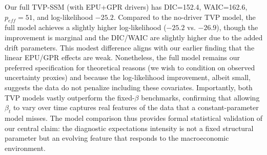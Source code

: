 \documentclass[12pt]{article}
\begin{document}
Our full TVP-SSM (with EPU+GPR drivers) has DIC=152.4, WAIC=162.6, $p_{eff}=51$, and log-likelihood $-25.2$. Compared to the no-driver TVP model, the full model achieves a slightly higher log-likelihood ($-25.2$ vs. $-26.9$), though the improvement is marginal and the DIC/WAIC are slightly higher due to the added drift parameters. This modest difference aligns with our earlier finding that the linear EPU/GPR effects are weak. Nonetheless, the full model remains our preferred specification for theoretical reasons (we wish to condition on observed uncertainty proxies) and because the log-likelihood improvement, albeit small, suggests the data do not penalize including these covariates. Importantly, both TVP models vastly outperform the fixed-$\beta$ benchmarks, confirming that allowing $\beta_t$ to vary over time captures real features of the data that a constant-parameter model misses. The model comparison thus provides formal statistical validation of our central claim: the diagnostic expectations intensity is not a fixed structural parameter but an evolving feature that responds to the macroeconomic environment.
\end{document}
